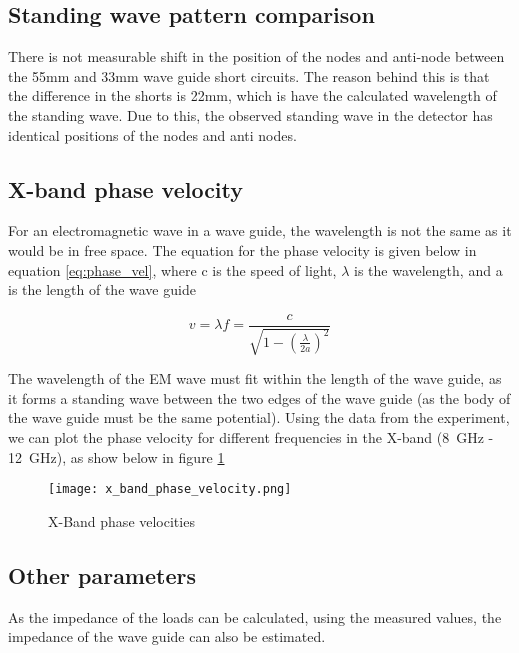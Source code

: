 \subsection*{Standing wave pattern comparison}
There is not measurable shift in the position of the nodes and anti-node between the 55mm and 33mm wave guide short circuits. The reason behind this is that the difference in the shorts is 22mm, which is have the calculated wavelength of the standing wave. Due to this, the observed standing wave in the detector has identical positions of the nodes and anti nodes.

\subsection*{X-band phase velocity}
For an electromagnetic wave in a wave guide, the wavelength is not the same as it would be in free space. The equation for the phase velocity is given below in equation \ref{eq:phase_vel}, where c is the speed of light, $\lambda$ is the wavelength, and a is the length of the wave guide

\begin{equation}
\label{eq:phase_vel}
v=\lambda f = \frac{c}{\sqrt{1-(\frac{\lambda}{2a})^2}}
\end{equation}

The wavelength of the EM wave must fit within the length of the wave guide, as it forms a standing wave between the two edges of the wave guide (as the body of the wave guide must be the same potential). Using the data from the experiment, we can plot the phase velocity for different frequencies in the X-band (\SI{8}{\giga\hertz} - \SI{12}{\giga\hertz}), as show below in figure \ref{fig:xband_phase_vel}

\begin{figure}[H]
	\begin{center}
		\texttt{[image: x\_band\_phase\_velocity.png]}
		\caption{X-Band phase velocities}
		\label{fig:xband_phase_vel}
	\end{center}
\end{figure}

\subsection*{Other parameters}
As the impedance of the loads can be calculated, using the measured values, the impedance of the wave guide can also be estimated. 
